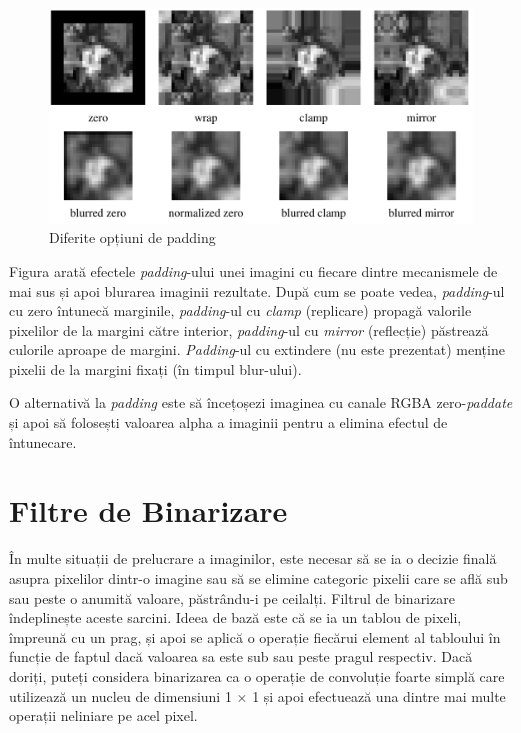 \documentclass[a4paper,12pt]{report}
\begin{document}
\begin{figure}[h!]
    \centering
    \includegraphics[width=1\textwidth]{images/padding.jpg}
    \caption{Diferite opțiuni de padding}
\end{figure}
\FloatBarrier

Figura arată efectele \textit{padding}-ului unei imagini cu fiecare dintre mecanismele de mai sus și apoi blurarea imaginii rezultate. După cum se poate vedea, \textit{padding}-ul cu zero întunecă marginile, \textit{padding}-ul cu \textit{clamp} (replicare) propagă valorile pixelilor de la margini către interior, \textit{padding}-ul cu \textit{mirror} (reflecție) păstrează culorile aproape de margini. \textit{Padding}-ul cu extindere (nu este prezentat) menține pixelii de la margini fixați (în timpul blur-ului).

O alternativă la \textit{padding} este să încețoșezi imaginea cu canale RGBA zero-\textit{paddate} și apoi să folosești valoarea alpha a imaginii pentru a elimina efectul de întunecare.

\section{Filtre de Binarizare}
În multe situații de prelucrare a imaginilor, este necesar să se ia o decizie finală asupra pixelilor dintr-o imagine sau să se elimine categoric pixelii care se află sub sau peste o anumită valoare, păstrându-i pe ceilalți. Filtrul de binarizare îndeplinește aceste sarcini. Ideea de bază este că se ia un tablou de pixeli, împreună cu un prag, și apoi se aplică o operație fiecărui element al tabloului în funcție de faptul dacă valoarea sa este sub sau peste pragul respectiv. Dacă doriți, puteți considera binarizarea ca o operație de convoluție foarte simplă care utilizează un nucleu de dimensiuni 1 × 1 și apoi efectuează una dintre mai multe operații neliniare pe acel pixel.
\end{document}
